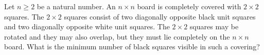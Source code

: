 Let $n \ge 2$ be a natural number. An $n \times n$ board is completely covered with $2\times 2$ squares.
The $2 \times 2$ squares consist of two diagonally opposite black unit squares and two diagonally
opposite white unit squares. The $2\times 2$ squares may be rotated and they may also overlap,
but they must lie completely on the $n\times n$ board.
What is the minimum number of black squares visible in such a covering?